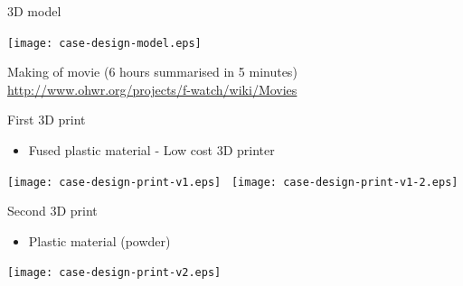 \documentclass[compress,red]{beamer}
\begin{document}
\begin{frame}{3D model}

  \begin{center}
    \texttt{[image: case-design-model.eps]}
  \end{center}

  Making of movie (6 hours summarised in 5 minutes)
  \url{http://www.ohwr.org/projects/f-watch/wiki/Movies}


\end{frame}

\begin{frame}{First 3D print}

  \begin{itemize}
  \item Fused plastic material - Low cost 3D printer
  \end{itemize}

  \begin{center}
    \texttt{[image: case-design-print-v1.eps]}~
    \texttt{[image: case-design-print-v1-2.eps]}
  \end{center}


\end{frame}

\begin{frame}{Second 3D print}

  \begin{itemize}
  \item Plastic material (powder)
  \end{itemize}

  \begin{center}
    \texttt{[image: case-design-print-v2.eps]}
  \end{center}


\end{frame}
\end{document}
